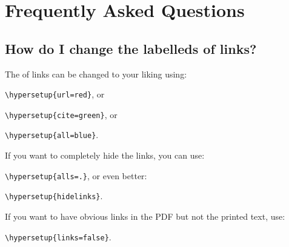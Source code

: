 
\chapter{Frequently Asked Questions} %

\label{AppendixA} %

\section{How do I change the labelleds of links?}

The  of links can be changed to your liking using:

{\small\verb!\hypersetup{url=red}!}, or

{\small\verb!\hypersetup{cite=green}!}, or

{\small\verb!\hypersetup{all=blue}!}.

\noindent If you want to completely hide the links, you can use:

{\small\verb!\hypersetup{alls=.}!}, or even better:

{\small\verb!\hypersetup{hidelinks}!}.

\noindent If you want to have obvious links in the PDF but not the printed text, use:

{\small\verb!\hypersetup{links=false}!}.

